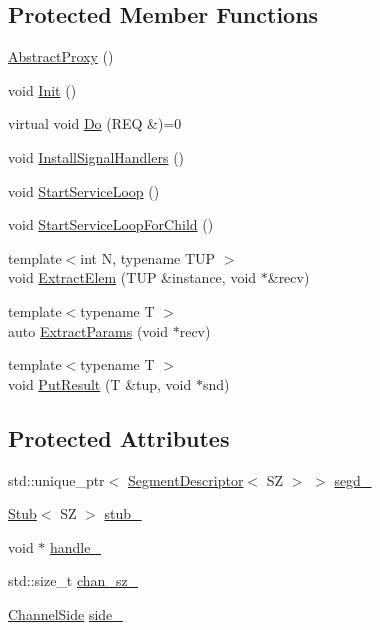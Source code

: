\subsection*{Protected Member Functions}
\begin{DoxyCompactItemize}
\item 
\hyperlink{classAbstractProxy_a7ab9f653b68797bbd32b6ed90116ca9d}{Abstract\+Proxy} ()
\item 
void \hyperlink{classAbstractProxy_a9d411fc2a8ff05b6cbf47b2152578e2a}{Init} ()
\item 
virtual void \hyperlink{classAbstractProxy_ab772bf6acfc0b7f69eae6fcc4039df8d}{Do} (R\+EQ \&)=0
\item 
void \hyperlink{classAbstractProxy_a9f368f0e76ba153626f0db982ebe389c}{Install\+Signal\+Handlers} ()
\item 
void \hyperlink{classAbstractProxy_ae0ce7181a041a8845a114f7f1c6768bf}{Start\+Service\+Loop} ()
\item 
void \hyperlink{classAbstractProxy_a8e4f4208efe95831a8bdb4cf139ec0f7}{Start\+Service\+Loop\+For\+Child} ()
\item 
{\footnotesize template$<$int N, typename T\+UP $>$ }\\void \hyperlink{classAbstractProxy_a71a17de97da68a12f3cc7d23995478e2}{Extract\+Elem} (T\+UP \&instance, void $\ast$\&recv)
\item 
{\footnotesize template$<$typename T $>$ }\\auto \hyperlink{classAbstractProxy_a64cad7553939288e10994b4a7fc2557f}{Extract\+Params} (void $\ast$recv)
\item 
{\footnotesize template$<$typename T $>$ }\\void \hyperlink{classAbstractProxy_ad3f858bad58a93f75984d2d0a5bc9081}{Put\+Result} (T \&tup, void $\ast$snd)
\end{DoxyCompactItemize}
\subsection*{Protected Attributes}
\begin{DoxyCompactItemize}
\item 
std\+::unique\+\_\+ptr$<$ \hyperlink{classSegmentDescriptor}{Segment\+Descriptor}$<$ SZ $>$ $>$ \hyperlink{classAbstractProxy_a747e1ccbb8314755f6218ab34b29c5cb}{segd\+\_\+}
\item 
\hyperlink{classStub}{Stub}$<$ SZ $>$ \hyperlink{classAbstractProxy_a2436619808b225e493b2e8745158b49d}{stub\+\_\+}
\item 
void $\ast$ \hyperlink{classAbstractProxy_a28c08cb0041452a38092340256ae4e4b}{handle\+\_\+}
\item 
std\+::size\+\_\+t \hyperlink{classAbstractProxy_a42fcfb0f73620c947800c4fca528db6b}{chan\+\_\+sz\+\_\+}
\item 
\hyperlink{proxy_8hpp_a249fda9ad200a554304ecf8de90d6877}{Channel\+Side} \hyperlink{classAbstractProxy_a15f6c1ab1f6a16ac7ba7a2d6e7bf8744}{side\+\_\+}
\end{DoxyCompactItemize}


